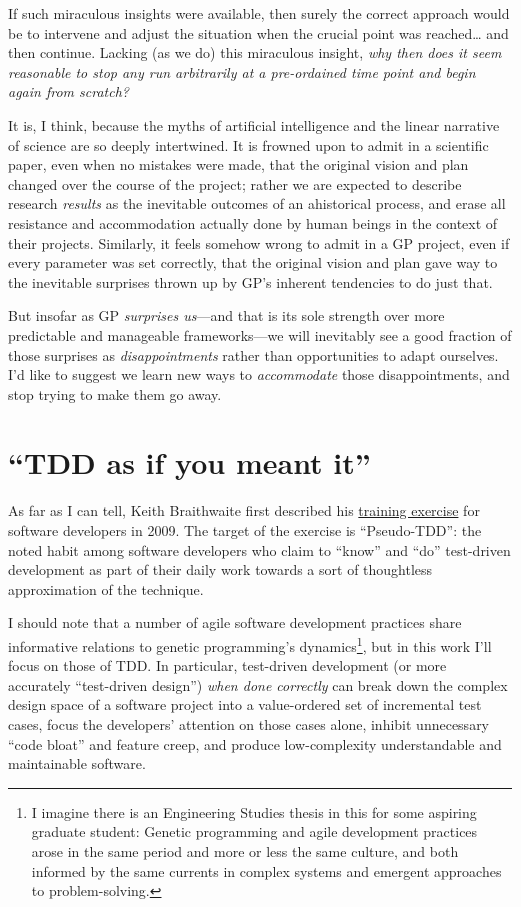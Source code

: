 If such miraculous insights were available, then surely the correct approach would be to intervene and adjust the situation when the crucial point was reached\ldots{} and then continue. Lacking (as we do) this miraculous insight, \emph{why then does it seem reasonable to stop any run arbitrarily at a pre-ordained time point and begin again from scratch?}

It is, I think, because the myths of artificial intelligence and the linear narrative of science are so deeply intertwined. It is frowned upon to admit in a scientific paper, even when no mistakes were made, that the original vision and plan changed over the course of the project; rather we are expected to describe research \emph{results} as the inevitable outcomes of an ahistorical process, and erase all resistance and accommodation actually done by human beings in the context of their projects. Similarly, it feels somehow wrong to admit in a GP project, even if every parameter was set correctly, that the original vision and plan gave way to the inevitable surprises thrown up by GP's inherent tendencies to do just that.

But insofar as GP \emph{surprises us}---and that is its sole strength over more predictable and manageable frameworks---we will inevitably see a good fraction of those surprises as \emph{disappointments} rather than opportunities to adapt ourselves. I'd like to suggest we learn new ways to \emph{accommodate} those disappointments, and stop trying to make them go away.

\section{``TDD as if you meant it''}\hypertarget{tdd-as-if-you-meant-it}{}\label{tdd-as-if-you-meant-it}

As far as I can tell, Keith Braithwaite first described his \href{http://cumulative-hypotheses.org/2011/08/30/tdd-as-if-you-meant-it/}{training exercise} for software developers in 2009. The target of the exercise is ``Pseudo-TDD'': the noted habit among software developers who claim to ``know'' and ``do'' test-driven development as part of their daily work towards a sort of thoughtless approximation of the technique.

I should note that a number of agile software development practices share informative relations to genetic programming's dynamics\footnote{I imagine there is an Engineering Studies thesis in this for some aspiring graduate student: Genetic programming and agile development practices arose in the same period and more or less the same culture, and both informed by the same currents in complex systems and emergent approaches to problem-solving.}, but in this work I'll focus on those of TDD. In particular, test-driven development (or more accurately ``test-driven design'') \emph{when done correctly} can break down the complex design space of a software project into a value-ordered set of incremental test cases, focus the developers' attention on those cases alone, inhibit unnecessary ``code bloat'' and feature creep, and produce low-complexity understandable and maintainable software.

